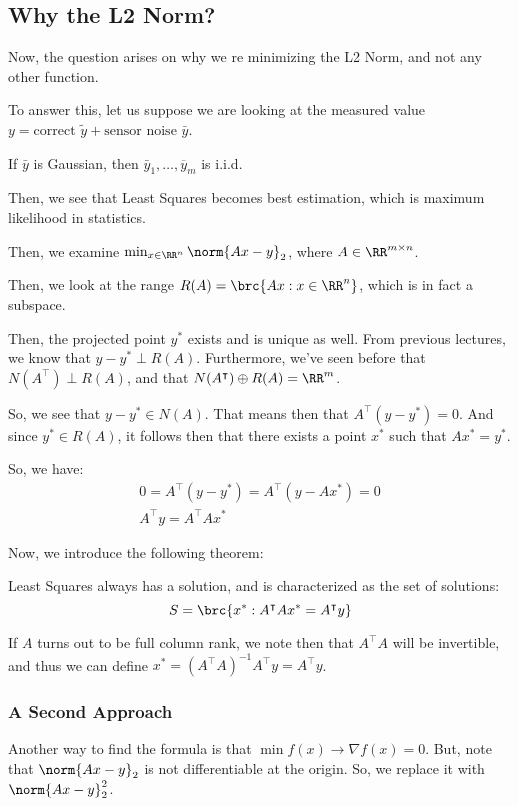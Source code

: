 \documentclass[openany]{book}
\begin{document}
\subsection{Why the L2 Norm?}
Now, the question arises on why we re minimizing the L2 Norm, and not any other function.

To answer this, let us suppose we are looking at the measured value $y = \text{correct } \tilde{y} + \text{sensor noise } \bar y$. 

If $\bar y$ is Gaussian, then $\bar{y}_1, \ldots, \overline{y}_m$ is i.i.d.

Then, we see that Least Squares becomes best estimation, which is maximum likelihood in statistics.

Then, we examine $\min_{x \in \RR^{n}} \norm{Ax-y}_2$, where $A \in \RR^{m \times n}$.

Then, we look at the range $R(A) = \brc{Ax : x \in \RR^{n}}$, which is in fact a subspace.

Then, the projected point $y^{*}$ exists and is unique as well. From previous lectures, we know that $y - y^{*} \perp R(A)$. Furthermore, we've seen before that $N(A^{\intercal}) \perp R(A)$, and that $N(A^{\intercal}) \oplus R(A) = \RR^{m}$.

So, we see that $y-y^{*} \in N(A)$. That means then that $A^{\intercal}(y-y^{*}) = 0$. And since $y^{*} \in R(A)$, it follows then that there exists a point $x^{*}$ such that $Ax^{*} = y^{*}$.

So, we have:
\begin{align*}
	0 = A^{\intercal}(y - y^{*}) = A^{\intercal}(y - Ax^{*}) = 0 \\
	A^{\intercal}y = A^{\intercal}Ax^{*}
\end{align*}

Now, we introduce the following theorem:
\begin{thm}
	Least Squares always has a solution, and is characterized as the set of solutions:\begin{equation*}
		S = \brc{x^{*} : A^{\intercal}Ax^{*} = A^{\intercal}y}
	\end{equation*}
\end{thm}

If $A$ turns out to be full column rank, we note then that $A^{\intercal}A$ will be invertible, and thus we can define $x^{*} = (A^{\intercal}A)^{-1}A^{\intercal}y = A^{\intercal}y$.

\subsubsection{A Second Approach}
Another way to find the formula is that $\min f(x) \rightarrow \nabla f(x) = 0$. But, note that $\norm{Ax-y}_2$ is not differentiable at the origin. So, we replace it with $\norm{Ax-y}_2^{2}$.
\end{document}
